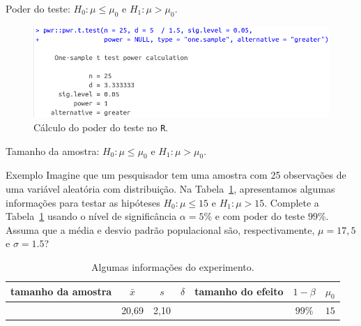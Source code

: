 \documentclass[8pt]{beamer}
\begin{document}
\begin{frame}{Poder do teste: $H_0:\mu \leq \mu_0$ e $H_1: \mu > \mu_0$.}

\begin{figure}[htbp]
	\centering
	\caption{Cálculo do poder do teste no \texttt{R}.}
	\includegraphics[width=0.9\linewidth]{figures/t-noncentral-power-unilateral-upper-R.png}
\end{figure}
\end{frame}

\begin{frame}{Tamanho da amostra: $H_0:\mu \leq \mu_0$ e $H_1: \mu > \mu_0$.}

\normalsize

\begin{block}{Exemplo}
		Imagine que um pesquisador tem uma amostra com 25 observações de uma variável aleatória com distribuição. Na Tabela~\ref{tab:normal-s2-unknown-unilateral-h0-upper-power}, apresentamos algumas informações para testar as hipóteses $H_0: \mu \leq 15$ e $H_1: \mu > 15$. Complete a Tabela~\ref{tab:normal-s2-unknown-unilateral-h0-upper-power} usando o nível de significância $\alpha=5\%$ e com poder do teste $99\%$. Assuma que a média e desvio padrão populacional são, respectivamente, $\mu=17,5$ e $\sigma=1.5$?
	\begin{table}[ht]
		\centering
		\begin{tabular}{c|c|c|c|c|c|c}
			\toprule[0.05cm]
			tamanho da amostra & $\bar{x}$ & $s$  &  $\delta$ & tamanho do efeito & $1-\beta$ & $\mu_0$ \\ 
			\midrule
			 & 20,69 & 2,10 &  &  & $99\%$ & $15$ \\ 
			\bottomrule[0.05cm]
		\end{tabular}
		\caption{Algumas informações do experimento.} 
		\label{tab:normal-s2-unknown-unilateral-h0-upper-power}
	\end{table}	
\end{block}

\normalsize

\end{frame}
\end{document}
